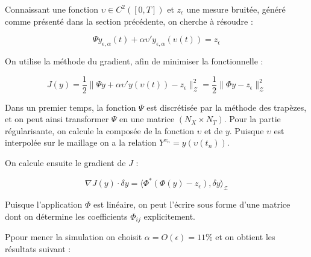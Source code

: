 \documentclass[a4paper]{article}
\newcommand{\Z}{\mathscr{Z}}
\newcommand{\yea}{y_{\epsilon, \alpha}}
\begin{document}
Connaissant une fonction $\upsilon \in C^2([0,T])$ et $z_\epsilon$ une mesure bruitée, généré comme présenté dans la section précédente, on cherche à résoudre :

\[ \Psi \yea(t) + \alpha \upsilon'\yea(\upsilon(t)) = z_{\epsilon} \]

On utilise la méthode du gradient, afin de minimiser la fonctionnelle :

\begin{equation}
	\label{eq:falpha}
	 J(y) = \frac{1}{2} \| \Psi y + \alpha \upsilon' y(\upsilon(t)) - z_{\epsilon} \|_{\Z}^2
	      = \frac{1}{2}\| \Phi y - z_\epsilon \|_{\Z}^2
\end{equation}

Dans un premier temps, la fonction $\Psi$ est discrétisée par la méthode des trapèzes, 
et on peut ainsi transformer $\Psi$ en une matrice $(N_X \times N_T)$. Pour la partie régularisante, on calcule la composée de la fonction $\upsilon$ et de $y$. 
Puisque $\upsilon$ est interpolée sur le maillage on a la relation $Y^{\upsilon_n} = y(\upsilon(t_n))$.

On calcule ensuite le gradient de $J$ :

\begin{equation}
	\label{eq:gradfalpha}
\nabla J(y) \cdot \delta y = \langle \Phi^* (\Phi(y) - z_{\epsilon}), 
                             \delta y \rangle_{\Z}
\end{equation}

Puisque l'application $\Phi$ est linéaire, on peut l'écrire sous forme d'une matrice dont on détermine les coefficients $\Phi_{ij}$ explicitement.

Ppour mener la simulation on choisit $\alpha = O(\epsilon) = 11 \%$ 
et on obtient les résultats suivant :
\end{document}
